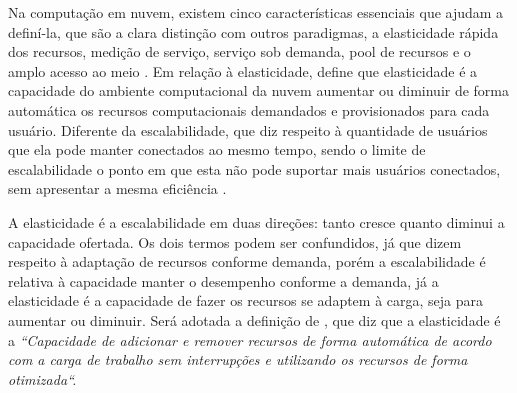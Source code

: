 \documentclass[twoside,english,brazilian]{UNISINOSartigo}
\begin{document}
Na computação em nuvem, existem cinco características essenciais que ajudam a definí-la, que são a clara distinção com outros paradigmas, a elasticidade rápida dos recursos, medição de serviço, serviço sob demanda, pool de recursos e o amplo acesso ao meio \cite{Moreira2010}. Em relação à elasticidade,  define que elasticidade é a capacidade do ambiente computacional da nuvem aumentar ou diminuir de forma automática os recursos computacionais demandados e provisionados para cada usuário. Diferente da escalabilidade, que diz respeito à quantidade de usuários que ela pode manter conectados ao mesmo tempo, sendo o limite de escalabilidade o ponto em que esta não pode suportar mais usuários conectados, sem apresentar a mesma  eficiência \cite{Wilder12}. 

A elasticidade é a escalabilidade em duas direções: tanto cresce quanto diminui a capacidade ofertada. Os dois termos podem ser confundidos, já que dizem respeito à adaptação de recursos conforme demanda, porém a escalabilidade é relativa à capacidade manter o desempenho conforme a demanda, já a elasticidade é a capacidade de fazer os recursos se adaptem à carga, seja para aumentar ou diminuir. 
Será adotada a definição de , que diz que a elasticidade é a \textit{``Capacidade de adicionar e remover recursos de forma automática de acordo com a carga de trabalho sem interrupções e utilizando os recursos de forma otimizada``.}
\end{document}
